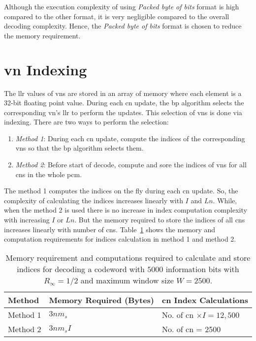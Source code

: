Although the execution complexity of using \emph{Packed byte of bits} format is high compared to the other format, it is very negligible compared to the overall decoding complexity. Hence, the \emph{Packed byte of bits} format is chosen to reduce the memory requirement.

\section{\acrlong{vn} Indexing}
The \gls{llr} values of \glspl{vn} are stored in an array of memory where each element is a 32-bit floating point value. During each \gls{cn} update, the \gls{bp} algorithm selects the corresponding \gls{vn}'s \gls{llr} to perform the updates. This selection of \glspl{vn} is done via indexing. There are two ways to perform the selection:
\begin{enumerate}
  \item \emph{Method 1}: During each \gls{cn} update, compute the indices of the corresponding \glspl{vn} so that the \gls{bp} algorithm selects them.
  \item \emph{Method 2}: Before start of decode, compute and sore the indices of \glspl{vn} for all \glspl{cn} in the whole \gls{pcm}.
\end{enumerate}

The method 1 computes the indices on the fly during each \gls{cn} update. So, the complexity of calculating the indices increases linearly with $I$ and $Ln$. While, when the method 2 is used there is no increase in index computation complexity with increasing $I$ or $Ln$. But the memory required to store the indices of all \glspl{cn} increases linearly with number of \glspl{cn}. Table~\ref{tab:idx_com} shows the memory and computation requirements for indices calculation in method 1 and method 2.
\begin{table}[htbp]
  \centering
  \begin{tabular}{|l|l|l|}
    \hline
    \textbf{Method} &\textbf{Memory Required (Bytes)} &\textbf{\gls{cn} Index Calculations}\\
    \hline
    \hline
    Method 1 &$3nm_s$ &No. of \gls{cn} $\times I=12,500$\\
    \hline
    Method 2 &$3nm_sI$ &No. of \gls{cn} = 2500\\
    \hline
  \end{tabular}
  \caption{Memory requirement and computations required to calculate and store indices for decoding a codeword with $5000$ information bits with $R_\infty=1/2$ and maximum window size $W=2500$.}
  \label{tab:idx_com}
\end{table}
 